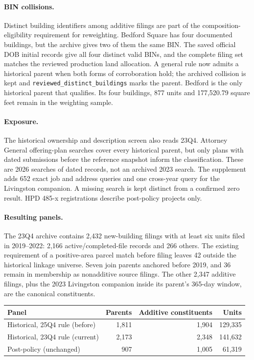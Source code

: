 \paragraph{BIN collisions.}
Distinct building identifiers among additive filings are part of the
composition-eligibility requirement for reweighting. Bedford Square has four
documented buildings, but the archive gives two of them the same BIN. The
saved official DOB initial records give all four distinct valid BINs, and the
complete filing set matches the reviewed production land allocation. A general
rule now admits a historical parent when both forms of corroboration hold; the
archived collision is kept and \texttt{reviewed\_distinct\_buildings} marks the
parent. Bedford is the only historical parent that qualifies. Its four
buildings, 877 units and 177,520.79 square feet remain in the weighting sample.

\paragraph{Exposure.}
The historical ownership and description screen also reads 23Q4. Attorney
General offering-plan searches cover every historical parent, but only plans
with dated submissions before the reference snapshot inform the
classification. These are 2026 searches of dated records, not an archived
2023 search. The supplement adds 652 exact job and address queries and one
cross-year query for the Livingston companion. A missing search is kept
distinct from a confirmed zero result. HPD 485-x registrations describe
post-policy projects only.

\paragraph{Resulting panels.}
The 23Q4 archive contains 2,432 new-building filings with at least six units
filed in 2019--2022: 2,166 active/completed-file records and 266 others. The
existing requirement of a positive-area parcel match before filing leaves 42
outside the historical linkage universe. Seven join parents anchored before
2019, and 36 remain in membership as nonadditive source filings. The other
2,347 additive filings, plus the 2023 Livingston companion inside its parent's
365-day window, are the canonical constituents.

\begin{center}
\small
\begin{tabular}{lrrr}
\hline
Panel & Parents & Additive constituents & Units \\
\hline
Historical, 25Q4 rule (before) & 1,811 & 1,904 & 129,335 \\
Historical, 23Q4 rule (current) & 2,173 & 2,348 & 141,632 \\
Post-policy (unchanged) & 907 & 1,005 & 61,319 \\
\hline
\end{tabular}
\end{center}

